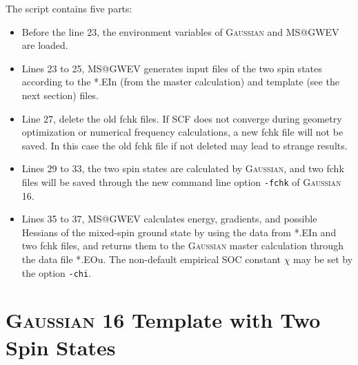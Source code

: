 \documentclass[UTF8]{article}
\begin{document}
The script contains five parts:
\begin{itemize}
\item Before the line 23, the environment variables of \textsc{Gaussian} and MS@GWEV are loaded.
\item Lines 23 to 25, MS@GWEV generates input files of the two spin states according to the *.EIn (from the master calculation) and template (see the next section) files.
\item Line 27, delete the old fchk files. If SCF does not converge during geometry optimization or numerical frequency calculations, a new fchk file will not be saved. In this case the old fchk file if not deleted may lead to strange results.
\item Lines 29 to 33, the two spin states are calculated by \textsc{Gaussian}, and two fchk files will be saved through the new command line option \verb|-fchk| of \textsc{Gaussian} 16.
\item Lines 35 to 37, MS@GWEV calculates energy, gradients, and possible Hessians of the mixed-spin ground state by using the data from *.EIn and two fchk files, and returns them to the \textsc{Gaussian} master calculation through the data file *.EOu.
    The non-default empirical SOC constant $\chi$ may be set by the option \verb|-chi|.
\end{itemize}

\section{\textsc{Gaussian} 16 Template with Two Spin States}
\end{document}
